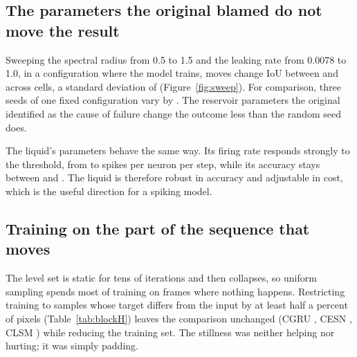 \subsection{The parameters the original blamed do not move the result}

Sweeping the spectral radius from 0.5 to 1.5 and the leaking rate from 0.0078
to 1.0, in a configuration where the model trains, moves change IoU between
\esnsweepmin{} and \esnsweepmax{} across \esnsweepcells{} cells, a standard
deviation of \esnsweepsd{} (Figure~\ref{fig:sweep}). For comparison, three
seeds of one fixed configuration vary by \seedrepsd{}. The reservoir
parameters the original identified as the cause of failure change the outcome
less than the random seed does.

The liquid's parameters behave the same way. Its firing rate responds strongly
to the threshold, from \lsmfiringmin{} to \lsmfiringmax{} spikes per neuron per
step, while its accuracy stays between \lsmsweepmin{} and \lsmsweepmax{}. The
liquid is therefore robust in accuracy and adjustable in cost, which is the
useful direction for a spiking model.

\subsection{Training on the part of the sequence that moves}

The level set is static for tens of iterations and then collapses, so uniform
sampling spends most of training on frames where nothing happens. Restricting
training to samples whose target differs from the input by at least half a
percent of pixels (Table~\ref{tab:blockH}) leaves the comparison unchanged
(CGRU \Hwsdgruchangeiou{}, CESN \Hwsdesnchangeiou{}, CLSM
\Hwsdlsmchangeiou{}) while reducing the training set. The stillness was
neither helping nor hurting; it was simply padding.
